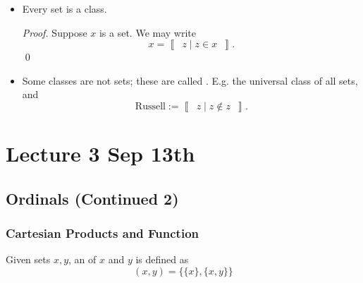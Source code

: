 \documentclass[notoc,notitlepage]{tufte-book}
\newcommand{\class}[1]{\left\llbracket \enspace #1 \enspace \right\rrbracket}
\begin{document}
\begin{note}
  \begin{itemize}
    \item Every set is a class.
      \begin{proof}
        Suppose $x$ is a set. We may write
        \begin{equation*}
          x = \class{ z \mid z \in x }.
        \end{equation*}\qed
      \end{proof}

    \item Some classes are not sets; these are called . E.g. the universal class of all sets, and
      \begin{equation*}
        \text{Russell} := \class{ z \mid z \notin z }.
      \end{equation*}
  \end{itemize}
\end{note}




\chapter{Lecture 3 Sep 13th}%
\label{chp:lecture_3_sep_13th}

\section{Ordinals (Continued 2)}%
\label{sec:ordinals_continued_2}

\subsection{Cartesian Products and Function}%
\label{sub:cartesian_products_and_function}

\begin{defn}
\label{defn:ordered_pairs}
  Given sets $x, y$, an  of $x$ and $y$ is defined as
  \begin{equation*}
    (x, y) = \{ \{ x \}, \{ x, y \} \}
  \end{equation*}
\end{defn}
\end{document}
